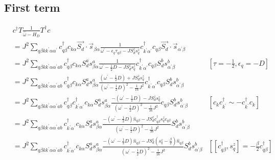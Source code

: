 \documentclass{revtex4-2}
\begin{document}
\subsection{First term}
\begin{align}
	&c^\dagger T \frac{1}{\hat \omega - H_D}T^\dagger c \\
	&= J^2\sum_{q\beta k k^\prime \alpha \alpha^\prime} c^\dagger_{q\beta} c_{k\alpha} \vec{S_d}\cdot\vec{s}_{\beta \alpha} \frac{1}{\omega^\prime - \epsilon_q\tau_{q\beta} - J S_d^z s_q^z}c^\dagger_{k^\prime\alpha^\prime} c_{q\beta} \vec{S_d}\cdot\vec{s}_{\alpha^\prime \beta}\\
	&= J^2\sum_{q\beta k k^\prime \alpha \alpha^\prime a b} c^\dagger_{q\beta} c_{k\alpha} S_d^a s^a_{\beta \alpha} \frac{1}{\omega^\prime - \frac{1}{2}D - J S_d^z s_q^z}c^\dagger_{k^\prime\alpha^\prime} c_{q\beta} S_d^b s^b_{\alpha^\prime \beta} & \left[\tau = -\frac{1}{2},\epsilon_q = -D\right] \\
							   &= J^2\sum_{q\beta k k^\prime \alpha \alpha^\prime a b} c^\dagger_{q\beta} c_{k\alpha} S_d^a s^a_{\beta \alpha} \frac{\left(\omega^\prime - \frac{1}{2}D\right) + J S_d^z s_q^z}{\left(\omega^\prime - \frac{1}{2}D\right)^2 - \frac{1}{16}J^2}c^\dagger_{k^\prime\alpha^\prime} c_{q\beta} S_d^b s^b_{\alpha^\prime \beta}\\
							   &= J^2\sum_{q\beta k k^\prime \alpha \alpha^\prime a b} c^\dagger_{q\beta} c^\dagger_{k^\prime\alpha^\prime}c_{k\alpha} S_d^a s^a_{\beta \alpha} \frac{-\left(\omega^\prime - \frac{1}{2}D\right) - J S_d^z s_q^z}{\left(\omega^\prime - \frac{1}{2}D\right)^2 - \frac{1}{16}J^2} c_{q\beta} S_d^b s^b_{\alpha^\prime \beta} & \left[c_k c^\dagger_{k^\prime} \sim - c^\dagger_{k^\prime}c_k\right] \\
							   &= J^2\sum_{q\beta k k^\prime \alpha \alpha^\prime a b} c^\dagger_{k^\prime\alpha^\prime}c_{k\alpha} S_d^a s^a_{\beta \alpha} \frac{-\left(\omega^\prime - \frac{1}{2}D\right) \hat n_{q\beta} - J S_d^z  c^\dagger_{q\beta}s_q^z c_{q\beta}}{\left(\omega^\prime - \frac{1}{2}D\right)^2 - \frac{1}{16}J^2} S_d^b s^b_{\alpha^\prime \beta} \\
							   &= J^2\sum_{q\beta k k^\prime \alpha \alpha^\prime a b} c^\dagger_{k^\prime\alpha^\prime}c_{k\alpha} S_d^a s^a_{\beta \alpha} \frac{-\left(\omega^\prime - \frac{1}{2}D\right) \hat n_{q\beta} - J S_d^z \left(s_q^z - \frac{\beta}{2}\right) \hat n_{q\beta}}{\left(\omega^\prime - \frac{1}{2}D\right)^2 - \frac{1}{16}J^2} S_d^b s^b_{\alpha^\prime \beta} & \left[\left[c^\dagger_{q\beta}, s_q^z\right] = -\frac{\beta}{2} c^\dagger_{q\beta}\right] \\

\end{align}
\end{document}
